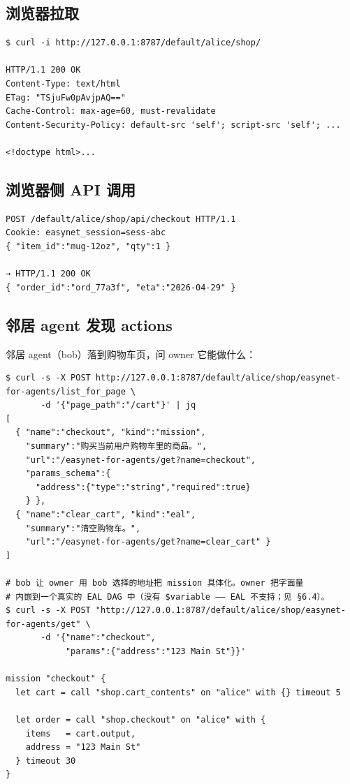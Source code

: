 \documentclass[11pt,a4paper]{article}
\theoremstyle{definition}
\begin{document}
\subsection{浏览器拉取}

\begin{lstlisting}
$ curl -i http://127.0.0.1:8787/default/alice/shop/

HTTP/1.1 200 OK
Content-Type: text/html
ETag: "TSjuFw0pAvjpAQ=="
Cache-Control: max-age=60, must-revalidate
Content-Security-Policy: default-src 'self'; script-src 'self'; ...

<!doctype html>...
\end{lstlisting}

\subsection{浏览器侧 API 调用}

\begin{lstlisting}
POST /default/alice/shop/api/checkout HTTP/1.1
Cookie: easynet_session=sess-abc
{ "item_id":"mug-12oz", "qty":1 }

→ HTTP/1.1 200 OK
{ "order_id":"ord_77a3f", "eta":"2026-04-29" }
\end{lstlisting}

\subsection{邻居 agent 发现 actions}

邻居 agent（bob）落到购物车页，问 owner 它能做什么：

\begin{lstlisting}
$ curl -s -X POST http://127.0.0.1:8787/default/alice/shop/easynet-for-agents/list_for_page \
       -d '{"page_path":"/cart"}' | jq
[
  { "name":"checkout", "kind":"mission",
    "summary":"购买当前用户购物车里的商品。",
    "url":"/easynet-for-agents/get?name=checkout",
    "params_schema":{
      "address":{"type":"string","required":true}
    } },
  { "name":"clear_cart", "kind":"eal",
    "summary":"清空购物车。",
    "url":"/easynet-for-agents/get?name=clear_cart" }
]

# bob 让 owner 用 bob 选择的地址把 mission 具体化。owner 把字面量
# 内嵌到一个真实的 EAL DAG 中（没有 $variable —— EAL 不支持；见 §6.4）。
$ curl -s -X POST "http://127.0.0.1:8787/default/alice/shop/easynet-for-agents/get" \
       -d '{"name":"checkout",
            "params":{"address":"123 Main St"}}'

mission "checkout" {
  let cart = call "shop.cart_contents" on "alice" with {} timeout 5

  let order = call "shop.checkout" on "alice" with {
    items   = cart.output,
    address = "123 Main St"
  } timeout 30
}
\end{lstlisting}
\end{document}
